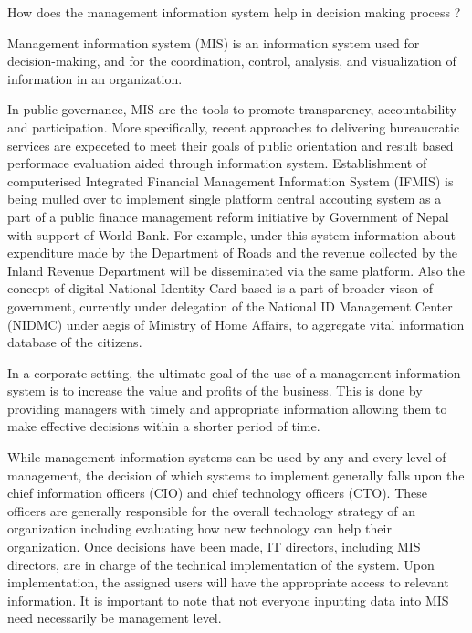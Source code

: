 \documentclass[
  openany]{book}
\newcommand{\question}{\item}
\begin{document}
\begin{questions}

\question How does the management information system help in decision making process ?

Management information system (MIS) is an information system used for decision-making, and for the coordination, control, analysis, and visualization of information in an organization.

In public governance, MIS are the tools to promote transparency, accountability and participation. More specifically, recent approaches to delivering bureaucratic services are expeceted to meet their goals of public orientation and result based performace evaluation aided through information system. Establishment of computerised Integrated Financial Management Information System (IFMIS) is being mulled over to implement single platform central accouting system as a part of a public finance management reform initiative by Government of Nepal with support of World Bank. For example, under this system information about expenditure made by the Department of Roads and the revenue collected by the Inland Revenue Department will be disseminated via the same platform. Also the concept of digital National Identity Card based is a part of broader vison of government, currently under delegation of the National ID Management Center (NIDMC) under aegis of Ministry of Home Affairs, to aggregate vital information database of the citizens.

In a corporate setting, the ultimate goal of the use of a management information system is to increase the value and profits of the business. This is done by providing managers with timely and appropriate information allowing them to make effective decisions within a shorter period of time.

While management information systems can be used by any and every level of management, the decision of which systems to implement generally falls upon the chief information officers (CIO) and chief technology officers (CTO). These officers are generally responsible for the overall technology strategy of an organization including evaluating how new technology can help their organization. Once decisions have been made, IT directors, including MIS directors, are in charge of the technical implementation of the system. Upon implementation, the assigned users will have the appropriate access to relevant information. It is important to note that not everyone inputting data into MIS need necessarily be management level.


\end{questions}
\end{document}
